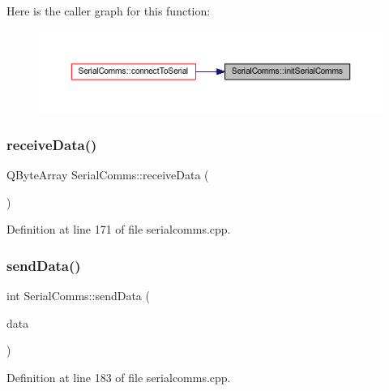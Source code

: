 Here is the caller graph for this function\+:
\nopagebreak
\begin{figure}[H]
\begin{center}
\leavevmode
\includegraphics[width=350pt]{class_serial_comms_aacd1dbe02e7eee87c7d75fc2049e71f4_icgraph}
\end{center}
\end{figure}
\mbox{\label{class_serial_comms_a27213be37d69250aaedc5c861c2d2200}} 
\subsubsection{\texorpdfstring{receiveData()}{receiveData()}}
{\footnotesize\ttfamily Q\+Byte\+Array Serial\+Comms\+::receive\+Data (\begin{DoxyParamCaption}{ }\end{DoxyParamCaption})}



Definition at line 171 of file serialcomms.\+cpp.

\mbox{\label{class_serial_comms_abcbc3cce26ff395684de26a07da7ca26}} 
\subsubsection{\texorpdfstring{sendData()}{sendData()}}
{\footnotesize\ttfamily int Serial\+Comms\+::send\+Data (\begin{DoxyParamCaption}\item[{const Q\+Byte\+Array \&}]{data }\end{DoxyParamCaption})}



Definition at line 183 of file serialcomms.\+cpp.

